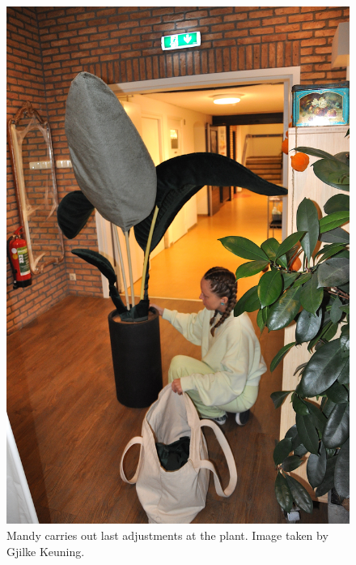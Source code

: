 \documentclass[authordate, empirical]{jote-new-article}
\begin{document}
	\begin{figure}
		\includegraphics[width=\linewidth]{media/fig+2.jpeg}

		\caption{Mandy carries out last adjustments at the plant. Image taken by Gjilke Keuning.}



	\end{figure}
\end{document}
